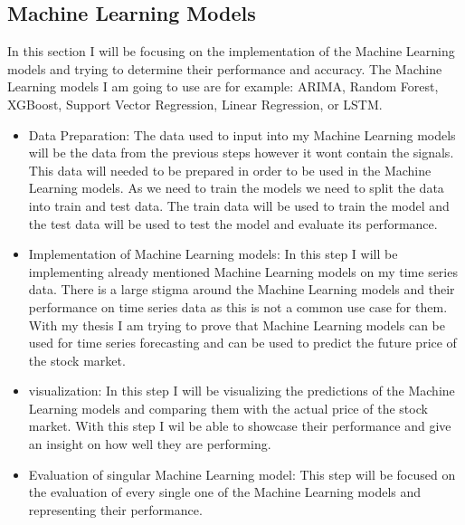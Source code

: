 \documentclass{imc-inf}
\begin{document}
	\subsection{Machine Learning Models}
	In this section I will be focusing on the implementation of the Machine Learning models and trying to determine their performance and accuracy.
	The Machine Learning models I am going to use are for example: ARIMA, Random Forest, XGBoost, Support Vector Regression, Linear Regression, or LSTM.
	\begin{itemize}
		\item Data Preparation: The data used to input into my Machine Learning models will be the data from the previous steps however it wont contain the signals.
		This data will needed to be prepared in order to be used in the Machine Learning models. As we need to train the models we need to split the data into train and test data. 
		The train data will be used to train the model and the test data will be used to test the model and evaluate its performance. 
		\item Implementation of Machine Learning models: In this step I will be implementing already mentioned Machine Learning models on my time series data. 
		There is a large stigma around the Machine Learning models and their performance on time series data as this is not a common use case for them. 
		With my thesis I am trying to prove that Machine Learning models can be used for time series forecasting and can be used to predict the future price of the stock market.
		\item visualization:  In this step I will be visualizing the predictions of the Machine Learning models and comparing them with the actual price of the stock market.
		With this step I wil be able to showcase their performance and give an insight on how well they are performing.
		\item Evaluation of singular Machine Learning model: This step will be focused on the evaluation of every single one of the Machine Learning models and representing their performance. 
	\end{itemize}
\end{document}
